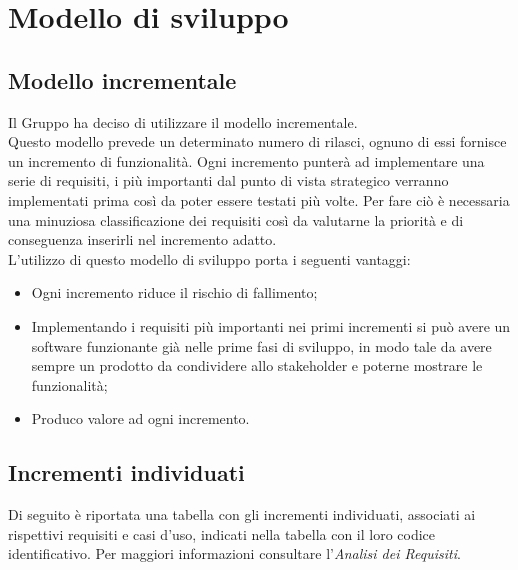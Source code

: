 \section{Modello di sviluppo}
\subsection{Modello incrementale}
Il Gruppo ha deciso di utilizzare il modello incrementale. \\
 Questo modello prevede un determinato numero di rilasci, ognuno di essi fornisce un incremento di funzionalità.
Ogni incremento punterà ad implementare una serie di requisiti,  i più importanti dal punto di vista strategico verranno implementati prima così da poter essere testati più volte.  Per fare ciò è necessaria una minuziosa classificazione dei requisiti così da valutarne la priorità e di conseguenza inserirli nel incremento adatto.\\
L'utilizzo di questo modello di sviluppo porta i seguenti vantaggi:
\begin{itemize}
\item Ogni incremento riduce il rischio di fallimento;
\item Implementando i requisiti più importanti nei primi incrementi si può avere un software funzionante già nelle prime fasi di sviluppo, in modo tale da avere sempre un prodotto da condividere allo stakeholder e poterne mostrare le funzionalità;
\item  Produco valore ad ogni incremento.
\end{itemize}

\subsection{Incrementi individuati}
Di seguito è riportata una tabella con gli incrementi individuati, associati ai rispettivi requisiti 
e casi d'uso, indicati nella tabella con il loro codice identificativo. Per maggiori informazioni consultare
l'\textit{Analisi dei Requisiti}.


